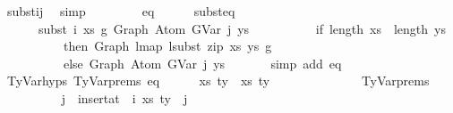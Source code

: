 \begin{isabellebody}
\ subst{\isacharunderscore}{\kern0pt}ij\ \isamarkupfalse%
\ simp\isanewline
\ \ \isamarkupfalse%
\isanewline
\ \ \ \ \isamarkupfalse%
\ eq\isanewline
\ \ \ \ \isamarkupfalse%
\ subst{\isacharunderscore}{\kern0pt}eq{\isacharcolon}{\kern0pt}\isanewline
\ \ \ \ \ \ {\isachardoublequoteopen}subst\ i\ xs\ g{}\ {\isacharparenleft}{\kern0pt}Graph\ {\isacharparenleft}{\kern0pt}Atom\ {\isacharparenleft}{\kern0pt}GVar\ j{\isacharparenright}{\kern0pt}\ ys{\isacharparenright}{\kern0pt}{\isacharparenright}{\kern0pt}\ {\isacharequal}{\kern0pt}\isanewline
\ \ \ \ \ \ \ \ \ {\isacharparenleft}{\kern0pt}if\ length\ xs\ {\isacharequal}{\kern0pt}\ length\ ys\isanewline
\ \ \ \ \ \ \ \ \ \ then\ Graph\ {\isacharparenleft}{\kern0pt}lmap\ {\isacharparenleft}{\kern0pt}lsubst\ {\isacharparenleft}{\kern0pt}zip\ xs\ ys{\isacharparenright}{\kern0pt}{\isacharparenright}{\kern0pt}\ g{}{\isacharparenright}{\kern0pt}\isanewline
\ \ \ \ \ \ \ \ \ \ else\ Graph\ {\isacharparenleft}{\kern0pt}Atom\ {\isacharparenleft}{\kern0pt}GVar\ j{\isacharparenright}{\kern0pt}\ ys{\isacharparenright}{\kern0pt}{\isacharparenright}{\kern0pt}{\isachardoublequoteclose}\isanewline
\ \ \ \ \ \isamarkupfalse%
\ {\isacharparenleft}{\kern0pt}simp\ add{\isacharcolon}{\kern0pt}\ eq{\isacharparenright}{\kern0pt}\isanewline
\isanewline
\ \ \ \ \isamarkupfalse%
\ TyVar{\isachardot}{\kern0pt}hyps{\isacharparenleft}{\kern0pt}{}{\isacharparenright}{\kern0pt}\ TyVar{\isachardot}{\kern0pt}prems{\isacharparenleft}{\kern0pt}{}{\isacharparenright}{\kern0pt}\ eq\isanewline
\ \ \ \ \isamarkupfalse%
\ {\isachardoublequoteopen}{\isacharparenleft}{\kern0pt}xs{\isacharprime}{\kern0pt}{\isacharcomma}{\kern0pt}\ ty{\isacharprime}{\kern0pt}{\isacharparenright}{\kern0pt}\ {\isacharequal}{\kern0pt}\ {\isacharparenleft}{\kern0pt}xs{\isacharcomma}{\kern0pt}\ ty{}{\isacharparenright}{\kern0pt}{\isachardoublequoteclose}\isanewline
\ \ \ \ \isamarkupfalse%
\ {\isacharminus}{\kern0pt}\isanewline
\ \ \ \ \ \ \isamarkupfalse%
\ TyVar{\isachardot}{\kern0pt}prems{\isacharparenleft}{\kern0pt}{}{\isacharparenright}{\kern0pt}\isanewline
\ \ \ \ \ \ \isamarkupfalse%
\ {\isachardoublequoteopen}{\isasymGamma}\ {\isacharbang}{\kern0pt}\ j\ {\isacharequal}{\kern0pt}\ {\isacharparenleft}{\kern0pt}insert{\isacharunderscore}{\kern0pt}at\ {\isasymGamma}{}\ i\ {\isacharparenleft}{\kern0pt}xs{\isacharcomma}{\kern0pt}\ ty{}{\isacharparenright}{\kern0pt}{\isacharparenright}{\kern0pt}\ {\isacharbang}{\kern0pt}\ j{\isachardoublequoteclose}\isanewline

\end{isabellebody}
